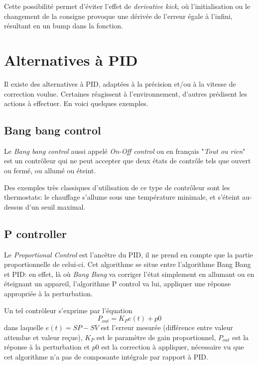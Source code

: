 Cette possibilité permet d'éviter l'effet de \emph{derivative kick}, où l'initialisation ou le changement de la consigne provoque une dérivée de l'erreur égale à l'infini, résultant en un bump dans la fonction.




\section{Alternatives à PID}
Il existe des alternatives à PID, adaptées à la précision et/ou à la vitesse de correction voulue. Certaines réagissent à l'environnement, d'autres prédisent les actions à effectuer. En voici quelques exemples.

\subsection{Bang bang control}
Le \emph{Bang bang control} aussi appelé \emph{On-Off control} ou en français "\emph{Tout ou rien}" est un contrôleur qui ne peut accepter que deux états de contrôle tels que ouvert ou fermé, ou allumé ou éteint.

Des exemples très classiques d'utilisation de ce type de contrôleur sont les thermostats: le chauffage s'allume sous une température minimale, et s'éteint au-dessus d'un seuil maximal.

\subsection{P controller}
Le \emph{Proportional Control} est l'ancêtre du PID, il ne prend en compte que la partie proportionnelle de celui-ci.
Cet algorithme se situe entre l'algorithme Bang Bang et PID:
en effet, là où \emph{Bang Bang} va corriger l'état simplement en allumant ou en éteignant un appareil, l'algorithme P control va lui, appliquer une réponse appropriée à la perturbation.

Un tel contrôleur s'exprime par l'équation
\begin{equation}P_{out} = K_{P}e(t) + p0\end{equation}
dans laquelle $e(t) = SP - SV$ est l'erreur mesurée (différence entre valeur attendue et valeur reçue), $K_{P}$ est le paramètre de gain proportionnel, $P_{out}$ est la réponse à la perturbation et $p0$ est la correction à appliquer, nécessaire vu que cet algorithme n'a pas de composante intégrale par rapport à PID.

